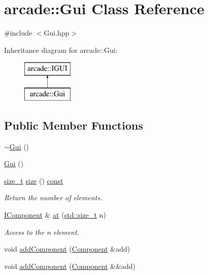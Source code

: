 \hypertarget{classarcade_1_1_gui}{\section{arcade\-:\-:Gui Class Reference}
\label{classarcade_1_1_gui}
}


{\ttfamily \#include $<$Gui.\-hpp$>$}

Inheritance diagram for arcade\-:\-:Gui\-:\begin{figure}[H]
\begin{center}
\leavevmode
\includegraphics[height=2.000000cm]{classarcade_1_1_gui}
\end{center}
\end{figure}
\subsection*{Public Member Functions}
\begin{DoxyCompactItemize}
\item 
\hyperlink{classarcade_1_1_gui_ac1218c8eea5d71f6fb5bb0d7c2b00cf4}{$\sim$\-Gui} ()
\item 
\hyperlink{classarcade_1_1_gui_aa8eca927f24c7b28721eb77ed30e0811}{Gui} ()
\item 
\hyperlink{nc__alloc_8h_a7b60c5629e55e8ec87a4547dd4abced4}{size\-\_\-t} \hyperlink{classarcade_1_1_gui_ae2dbef3ca94b6ce56a51351fec9da03b}{size} () \hyperlink{term__entry_8h_a57bd63ce7f9a353488880e3de6692d5a}{const} 
\begin{DoxyCompactList}\small\item\em Return the number of elements. \end{DoxyCompactList}\item 
\hyperlink{classarcade_1_1_i_component}{I\-Component} \& \hyperlink{classarcade_1_1_gui_abc26843cdfdb2a3bc7da2d5a439d5231}{at} (\hyperlink{nc__alloc_8h_a7b60c5629e55e8ec87a4547dd4abced4}{std\-::size\-\_\-t} n)
\begin{DoxyCompactList}\small\item\em Access to the n element. \end{DoxyCompactList}\item 
void \hyperlink{classarcade_1_1_gui_a3d190ab226de112908c2cb3c45121cf9}{add\-Component} (\hyperlink{classarcade_1_1_component}{Component} \&add)
\item 
void \hyperlink{classarcade_1_1_gui_a6faa239ed59b5a8f914d3b2c80091d25}{add\-Component} (\hyperlink{classarcade_1_1_component}{Component} \&\&add)
\end{DoxyCompactItemize}


